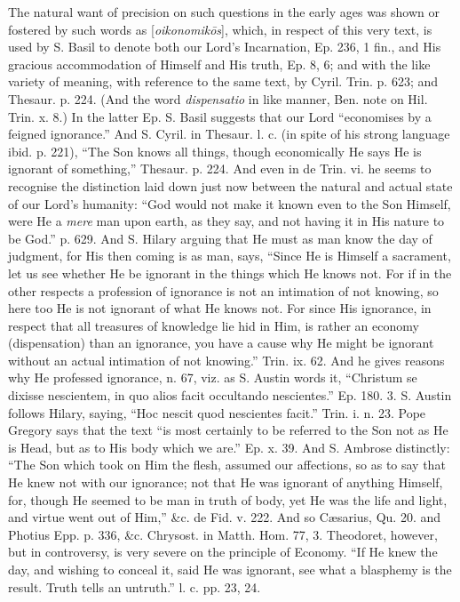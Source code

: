 The natural want of precision on such questions
in the early ages was shown or fostered by such words as [\emph{oikonomik\={o}s}],
which, in respect of this very text, is used by S. Basil to denote
both our Lord's Incarnation, Ep. 236, 1 fin., and His gracious
accommodation of Himself and His truth, Ep. 8, 6; and with the like
variety of meaning, with reference to the same text, by Cyril. Trin.
p. 623; and Thesaur. p. 224. (And the word \emph{dispensatio} in like
manner, Ben. note on Hil. Trin. x. 8.) In the latter Ep. S. Basil
suggests that our Lord ``economises by a feigned ignorance.'' And S.
Cyril. in Thesaur. l. c. (in spite of his strong language ibid. p.
221), ``The Son knows all things, though economically He says He is
ignorant of something,'' Thesaur. p. 224. And even in de Trin. vi. he
seems to recognise the distinction laid down just now between
the natural and actual state of our Lord's humanity: ``God would
not make it known even to the Son Himself, were He a \emph{mere} man
upon earth, as they say, and not having it in His nature to be God.''
p. 629. And S. Hilary arguing that He must as man know the day of
judgment, for His then coming is as man, says, ``Since He is Himself
a sacrament, let us see whether He be ignorant in the things which He
knows not. For if in the other respects a profession of ignorance is
not an intimation of not knowing, so here too He is not ignorant of
what He knows not. For since His ignorance, in respect that all
treasures of knowledge lie hid in Him, is rather an economy
(dispensation) than an ignorance, you have a cause why He might be
ignorant without an actual intimation of not knowing.'' Trin. ix. 62.
And he gives reasons why He professed ignorance, n. 67, viz. as S.
Austin words it, ``Christum se dixisse nescientem, in quo alios facit
occultando nescientes.'' Ep. 180. 3. S. Austin follows Hilary,
saying, ``Hoc nescit quod nescientes facit.'' Trin. i. n. 23. Pope
Gregory says that the text ``is most certainly to be referred to the
Son not as He is Head, but as to His body which we are.'' Ep. x. 39.
And S. Ambrose distinctly: ``The Son which took on Him the flesh,
assumed our affections, so as to say that He knew not with our
ignorance; not that He was ignorant of anything Himself, for, though
He seemed to be man in truth of body, yet He was the life and light,
and virtue went out of Him,'' \&c. de Fid. v. 222. And so Cæsarius,
Qu. 20. and Photius Epp. p. 336, \&c. Chrysost. in Matth. Hom. 77,
3. Theodoret, however, but in controversy, is very severe on the
principle of Economy. ``If He knew the day, and wishing to conceal
it, said He was ignorant, see what a blasphemy is the result. Truth
tells an untruth.'' l. c. pp. 23, 24.

